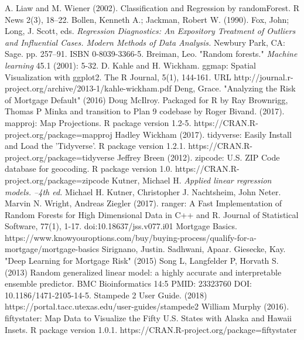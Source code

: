 \newpage
\begin{thebibliography}{99}
A. Liaw and M. Wiener (2002). Classification and Regression by
randomForest. R News 2(3), 18--22.
Bollen, Kenneth A.; Jackman, Robert W. (1990). Fox, John; Long, J. Scott, eds. 
\textit{Regression Diagnostics: An Expository Treatment of Outliers and Influential Cases. Modern Methods of Data Analysis.}
Newbury Park, CA: Sage. pp. 257–91. ISBN 0-8039-3366-5.
Breiman, Leo. "Random forests." \textit{Machine learning} 45.1 (2001): 5-32.
D. Kahle and H. Wickham. ggmap: Spatial Visualization with ggplot2. The
R Journal, 5(1), 144-161. URL
http://journal.r-project.org/archive/2013-1/kahle-wickham.pdf
Deng, Grace. "Analyzing the Risk of Mortgage Default" (2016)
Doug McIlroy. Packaged for R by Ray Brownrigg, Thomas P Minka and
transition to Plan 9 codebase by Roger Bivand. (2017). mapproj: Map
Projections. R package version 1.2-5.
https://CRAN.R-project.org/package=mapproj
Hadley Wickham (2017). tidyverse: Easily Install and Load the
'Tidyverse'. R package version 1.2.1.
https://CRAN.R-project.org/package=tidyverse
Jeffrey Breen (2012). zipcode: U.S. ZIP Code database for geocoding. R
package version 1.0. https://CRAN.R-project.org/package=zipcode
Kutner, Michael H. 
\textit{Applied linear regression models. --4th ed.} Michael H. Kutner, Christopher J. Nachtsheim, John Neter.
Marvin N. Wright, Andreas Ziegler (2017). ranger: A Fast Implementation
of Random Forests for High Dimensional Data in C++ and R. Journal of
Statistical Software, 77(1), 1-17. doi:10.18637/jss.v077.i01
Mortgage Basics. https://www.knowyouroptions.com/buy/buying-process/qualify-for-a-mortgage/mortgage-basics
Sirignano, Justin. Sadhwani, Apaar. Giesecke, Kay. "Deep Learning for Mortgage Risk" (2015)
Song L, Langfelder P, Horvath S. (2013) Random generalized linear model: a highly accurate and interpretable ensemble predictor. BMC Bioinformatics 14:5 PMID: 23323760 DOI: 10.1186/1471-2105-14-5.
Stampede 2 User Guide. (2018) https://portal.tacc.utexas.edu/user-guides/stampede2
William Murphy (2016). fiftystater: Map Data to Visualize the Fifty U.S.
States with Alaska and Hawaii Insets. R package version 1.0.1.
https://CRAN.R-project.org/package=fiftystater
\end{thebibliography}
